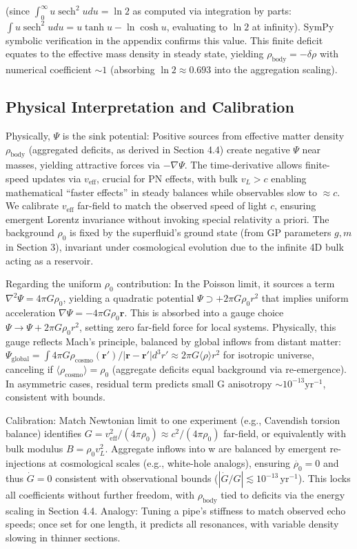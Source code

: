 \documentclass{article}
\DeclareMathOperator{\sech}{sech}
\begin{document}
(since $\int_0^\infty u \sech^2 u du = \ln 2$ as computed via integration by parts: $\int u \sech^2 u du = u \tanh u - \ln \cosh u$, evaluating to $\ln 2$ at infinity). SymPy symbolic verification in the appendix confirms this value. This finite deficit equates to the effective mass density in steady state, yielding $\rho_{\text{body}} = - \delta \rho$ with numerical coefficient $\sim 1$ (absorbing $\ln 2 \approx 0.693$ into the aggregation scaling).

\subsection{Physical Interpretation and Calibration}

Physically, $\Psi$ is the sink potential: Positive sources from effective matter density $\rho_{\text{body}}$ (aggregated deficits, as derived in Section 4.4) create negative $\Psi$ near masses, yielding attractive forces via $-\nabla \Psi$. The time-derivative allows finite-speed updates via $v_{\text{eff}}$, crucial for PN effects, with bulk $v_L > c$ enabling mathematical ``faster effects'' in steady balances while observables slow to $\approx c$. We calibrate $v_{\text{eff}}$ far-field to match the observed speed of light $c$, ensuring emergent Lorentz invariance without invoking special relativity a priori. The background $\rho_0$ is fixed by the superfluid's ground state (from GP parameters $g, m$ in Section 3), invariant under cosmological evolution due to the infinite 4D bulk acting as a reservoir.

Regarding the uniform $\rho_0$ contribution: In the Poisson limit, it sources a term $\nabla^2 \Psi = 4\pi G \rho_0$, yielding a quadratic potential $\Psi \supset +2\pi G \rho_0 r^2$ that implies uniform acceleration $\nabla \Psi = -4\pi G \rho_0 \mathbf{r}$. This is absorbed into a gauge choice $\Psi \to \Psi + 2\pi G \rho_0 r^2$, setting zero far-field force for local systems. Physically, this gauge reflects Mach's principle, balanced by global inflows from distant matter: $\Psi_{\text{global}} = \int 4\pi G \rho_{\text{cosmo}}(\mathbf{r}') / |\mathbf{r} - \mathbf{r}'| d^3 r' \approx 2\pi G \langle \rho \rangle r^2$ for isotropic universe, canceling if $\langle \rho_{\text{cosmo}} \rangle = \rho_0$ (aggregate deficits equal background via re-emergence). In asymmetric cases, residual term predicts small G anisotropy $\sim 10^{-13} \mathrm{yr}^{-1}$, consistent with bounds.

Calibration: Match Newtonian limit to one experiment (e.g., Cavendish torsion balance) identifies $G = v_{\text{eff}}^2 / (4\pi \rho_0) \approx c^2 / (4\pi \rho_0)$ far-field, or equivalently with bulk modulus $B = \rho_0 v_L^2$. Aggregate inflows into w are balanced by emergent re-injections at cosmological scales (e.g., white-hole analogs), ensuring $\dot{\rho_0} = 0$ and thus $\dot{G} = 0$ consistent with observational bounds ($ |\dot{G}/G| \lesssim 10^{-13} \, \mathrm{yr}^{-1} $). This locks all coefficients without further freedom, with $\rho_{\text{body}}$ tied to deficits via the energy scaling in Section 4.4. Analogy: Tuning a pipe's stiffness to match observed echo speeds; once set for one length, it predicts all resonances, with variable density slowing in thinner sections.
\end{document}
